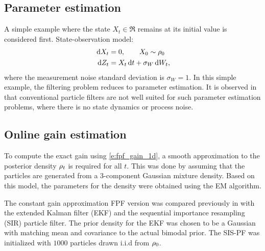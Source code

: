 \subsection{Parameter estimation }
\label{s:param_estimation} 
A simple example where the state $X_t \in \Re$ remains at its initial value is considered first.
State-observation model:
\[
\begin{aligned}
\,\textmd{d} X_t&=0, \qquad X_0 \sim \rho_0\\
\,\textmd{d} Z_t&= X_t \,\textmd{d} t+\sigma_{W}\,\textmd{d} W_t,
\end{aligned}
\]
where the measurement noise standard deviation is $\sigma_{W} = 1$. 
In this simple example, the filtering problem reduces to parameter estimation. It is observed in \cite{arumasgorcla02} that conventional particle filters are not well suited for such parameter estimation problems, where there is no state dynamics or process noise.
%
\subsection*{Online gain estimation}
To compute the exact gain using \eqref{e:fpf_gain_1d}, a smooth approximation to the posterior density $\rho_t$ is required for all $t$. This was done by assuming that the particles are generated from a  3-component Gaussian mixture density. Based on this model, the parameters for the density were obtained using the EM algorithm.

The constant gain approximation FPF  version was compared previously in \cite{tilghiomeh13} with the extended Kalman filter (EKF) and the  sequential importance resampling (SIR) particle filter. The prior density for the EKF was chosen to be a Gaussian with matching mean and covariance to the actual bimodal prior. The SIS-PF was   initialized with $1000$ particles drawn i.i.d from $\rho_0$.

